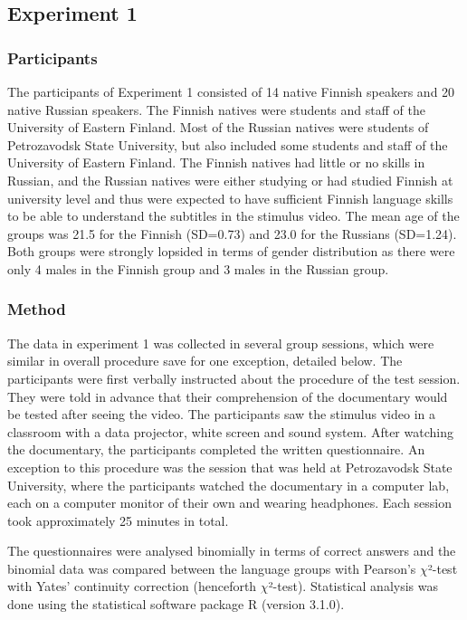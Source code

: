 \documentclass[output=paper]{langsci/langscibook}
\begin{document}
\subsection{Experiment 1}

\subsubsection{Participants}

The participants of Experiment 1 consisted of 14 native Finnish speakers and 20 native Russian speakers. The Finnish natives were students and staff of the University of Eastern Finland. Most of the Russian natives were students of Petrozavodsk State University, but also included some students and staff of the University of Eastern Finland. The Finnish natives had little or no skills in Russian, and the Russian natives were either studying or had studied Finnish at university level and thus were expected to have sufficient Finnish language skills to be able to understand the subtitles in the stimulus video. The mean age of the groups was 21.5 for the Finnish (SD=0.73) and 23.0 for the Russians (SD=1.24). Both groups were strongly lopsided in terms of gender distribution as there were only 4 males in the Finnish group and 3 males in the Russian group.

\subsubsection{Method}

The data in experiment 1 was collected in several group sessions, which were similar in overall procedure save for one exception, detailed below. The participants were first verbally instructed about the procedure of the test session. They were told in advance that their comprehension of the documentary would be tested after seeing the video. The participants saw the stimulus video in a classroom with a data projector, white screen and sound system. After watching the documentary, the participants completed the written questionnaire. An exception to this procedure was the session that was held at Petrozavodsk State University, where the participants watched the documentary in a computer lab, each on a computer monitor of their own and wearing headphones. Each session took approximately 25 minutes in total.

The questionnaires were analysed binomially in terms of correct answers and the binomial data was compared between the language groups with Pearson's $\chi $²-test with Yates' continuity correction (henceforth $\chi $²-test). Statistical analysis was done using the statistical software package R (version 3.1.0).
\end{document}
